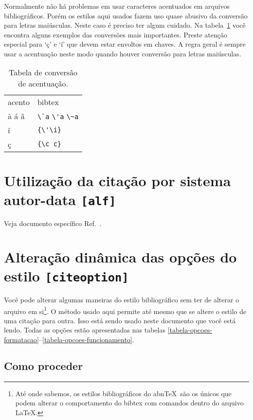 \documentclass[a4paper]{ltxdoc}
\newcommand{\abnTeX}{abn\TeX}
\begin{document}
Normalmente não há problemas em usar caracteres acentuados em arquivos
bibliográficos. Porém os estilos aqui usados fazem uso quase abusivo da
conversão para letras maiúsculas. Neste caso é preciso ter algum cuidado.
Na tabela~\ref{tabela-acentos} você encontra alguns exemplos das conversões
mais importantes. Preste atenção especial para `ç' e `í' que devem estar
envoltos em chaves. A regra geral é sempre usar a acentuação neste modo quando
houver conversão para letras maiúsculas.

\begin{table}[htbp]
\caption{Tabela de conversão de acentuação.}
\label{tabela-acentos}

\begin{center}
\begin{tabular}{ll}\hline\hline
acento & \textsf{bibtex}\\
à á ã & \verb+\`a+ \verb+\'a+ \verb+\~a+\\
í & \verb+{\'\i}+\\
ç & \verb+{\c c}+\\
\hline\hline
\end{tabular}
\end{center}
\end{table}


\section{Utilização da citação por sistema autor-data {\tt [alf]}}

Veja documento específico Ref.~.

\section{Alteração dinâmica das opções do estilo {\tt [citeoption]}}

\label{chapter-opcoes-estilo}

Você pode alterar algumas maneiras do estilo bibliográfico sem ter de alterar o
arquivo em si\footnote{Até onde sabemos, os estilos bibliográficos do \abnTeX\
são os únicos que podem alterar o comportamento do \textsf{bibtex} com comandos
dentro do arquivo \LaTeX.}. O método usado aqui permite até mesmo que se altere o estilo
de uma citação para outra. Isso está sendo usado neste documento que você está
lendo. Todas as opções estão apresentadas nas tabelas
\ref{tabela-opcoes-formatacao}--\ref{tabela-opcoes-funcionamento}.

\subsection{Como proceder}
\end{document}
